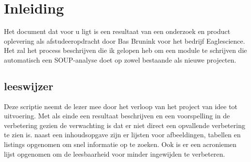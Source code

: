 \chapter{Inleiding} \label{ch:inleiding} %

\label{ch:Inleiding} %
Het document dat voor u ligt is een resultaat van een onderzoek en product oplevering als afstudeeropdracht door Bas Brunink voor het bedrijf Eaglescience.
Het zal het process beschrijven die ik gelopen heb om een module te schrijven die automatisch een SOUP-analyse doet op zowel bestaande als nieuwe projecten.

\section{leeswijzer} \label{sec:leeswijzer}
Deze scriptie neemt de lezer mee door het verloop van het project van idee tot uitvoering.
Met als einde een resultaat beschrijven en een voorspelling in de verbetering gezien de verwachting is dat er niet direct een opvallende verbetering te zien is.
naast een inhoudsopgave zijn er lijsten voor afbeeldingen, tabellen en listings opgenomen om snel informatie op te zoeken.
Ook is er een acroniemen lijst opgenomen om de leesbaarheid voor minder ingewijden te verbeteren.
